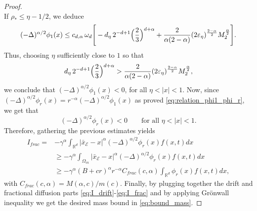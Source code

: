 \documentclass[10pt,a4paper]{amsart}
\def\RR{\mathbb R}
\begin{document}
\begin{proof}
\[	\]
	If $\rho_*\le \eta-1/2$, we deduce
	\begin{equation*}
		(-\Delta)^{\alpha/2}\phi_1(x)
		\le c_{d,\alpha}\,\omega_d\Bigg[
		- d_\eta\,2^{-d+1}\Bigl(\frac{2}{3}\Bigr)^{d+\alpha}
		+ \frac{2}{\alpha(2-\alpha)}(2\varepsilon_\eta)^{\frac{2-\alpha}{2}} M_2^{\frac{\alpha}{2}}
		\Bigg].
	\end{equation*}
	Thus, choosing $\eta$ sufficiently close to $1$ so that
	\begin{equation*}
		d_\eta\,2^{-d+1}\Bigl(\frac{2}{3}\Bigr)^{d+\alpha}
		>
		\frac{2}{\alpha(2-\alpha)}(2\varepsilon_\eta)^{\frac{2-\alpha}{2}} M_2^{\frac{\alpha}{2}},
	\end{equation*}
	we conclude that
	$(-\Delta)^{\alpha/2}\phi_1(x)<0$, for all  $\eta<|x|<1.
	$ 
	Now, since $(-\Delta)^{\alpha/2}\phi_r(x) = r^{-\alpha} (-\Delta)^{\alpha/2}\phi_1(x)$ as proved \eqref{eq:relation_phi1_phi_r}, we get that 
	\[
	(-\Delta)^{\alpha/2}\phi_r(x)<0 \qquad \text{for all } \eta<|x|<1.
	\]
	Therefore, gathering the previous estimates yields
	\begin{equation}\label{eq:I_frac}
		\begin{split}
			I_{frac} = &-\gamma^\alpha \int_{\RR^d} \vert \bar{x}_\mathcal{E} -x \vert^\alpha   (-\Delta)^{\alpha/2} \phi_r(x) f(x,t) dx \\
			& \geq -\gamma^\alpha \int_{\Omega_{in}} \vert \bar{x}_\mathcal{E} -x \vert^\alpha   (-\Delta)^{\alpha/2} \phi_r(x) f(x,t) dx \\
			& \geq -\gamma^\alpha (B+cr)^\alpha r^{-\alpha} C_{frac}(c,\alpha)  \int_{\RR^d} \phi_r(x) f(x,t) dx,%
		\end{split}
	\end{equation}
	with $C_{frac}(c,\alpha) =  M(\alpha,c)/m(c)$.
	Finally, by plugging together the drift and fractional diffusion parts \eqref{eq:I_drift}-\eqref{eq:I_frac} and by applying Gr{\"o}nwall inequality we get the desired mass bound in \eqref{eq:bound_mass}. 
\end{proof}
\end{document}
